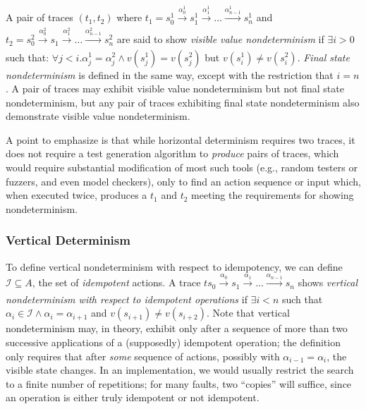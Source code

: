 A pair of traces $(t_1, t_2)$ where $t_1 = s^1_0
\xrightarrow[]{\alpha^1_0} s^1_1 \xrightarrow[]{\alpha^1_1} \ldots
\xrightarrow[]{\alpha^1_{n-1}} s^1_n$ and $t_2 = s^2_0
\xrightarrow[]{\alpha^2_0} s_1 \xrightarrow[]{\alpha^2_1} \ldots
\xrightarrow[]{\alpha^2_{n-1}} s^2_n$ are said to show \emph{visible value
  nondeterminism} if $\exists i > 0$ such that: $\forall j < i . \alpha^1_j = \alpha^2_j \wedge
v(s^1_j) = v(s^2_j)$ but $v(s^1_i) \neq v(s^2_i)$.  \emph{Final state
  nondeterminism} is defined in the same way, except with the
restriction that $i = n$.  A pair of traces may exhibit visible value
nondeterminism but not final state nondeterminism, but any pair of
traces exhibiting final state nondeterminism also demonstrate visible
value nondeterminism.

A point to emphasize is that while horizontal determinism
requires two traces, it does not require a test generation algorithm
to \emph{produce} pairs of traces, which would require substantial
modification of most such tools (e.g., random testers or fuzzers, and
even model checkers), only to find an
action sequence or input which, when executed twice, produces a $t_1$ and $t_2$
meeting the requirements for showing nondeterminism.

\subsubsection{Vertical Determinism}

To define vertical nondeterminism with
respect to idempotency, we can
define $\mathcal{I} \subseteq A$, the set of \emph{idempotent}
actions.  A trace $t s_0
\xrightarrow[]{\alpha_0} s_1 \xrightarrow[]{\alpha_1} \ldots
\xrightarrow[]{\alpha_{n-1}} s_n$ shows \emph{vertical nondeterminism
  with respect to idempotent operations} if $\exists i < n$ such that
$\alpha_i \in \mathcal{I} \wedge \alpha_i = \alpha_{i+1}$ and $v(s_{i+1})
\neq v(s_{i+2})$.  Note that vertical nondeterminism may, in theory, exhibit only
after a sequence of more than two successive applications of a (supposedly)
idempotent operation; the definition only requires that after \emph{some}
sequence of actions, possibly with $\alpha_{i-1} = \alpha_i$, the
visible state changes.  In an implementation, we would usually restrict the
search to a finite number of repetitions; for many faults, two
``copies'' will suffice, since an operation is either truly idempotent or
not idempotent.

